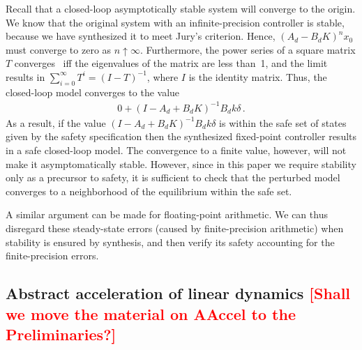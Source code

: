 \documentclass[twocolumn]{autart}    %
\renewcommand{\note}[1]{\textcolor{red}{[#1]}}
\begin{document}
\normalsize
Recall that a closed-loop asymptotically stable system will converge to the origin.  
We know that the original system with an infinite-precision controller is stable, 
because we have synthesized it to meet Jury's criterion.  
Hence, $(A_d - B_dK)^n x_0$  must converge to zero as $n \uparrow \infty$. 
Furthermore, the power series of a square matrix $T$ converges~\cite{horn1990matrix} iff the eigenvalues of the matrix are less
than~1, and the limit results in 
%
$\sum_{i=0}^{\infty}T^i  = (I - T)^{-1}$, 
%
where $I$ is the identity matrix. 
Thus, the closed-loop model converges to the value 
%
\begin{align*}
0 + (I - A_d + B_dK)^{-1}B_dk\delta \,. 
\end{align*}
%
As a result, if the value $(I - A_d + B_dK)^{-1}B_dk\delta$ is within the safe set of states given by the safety specification
then the synthesized fixed-point controller results in a safe
closed-loop model.  The convergence to a finite value, however, will not
make it asymptomatically stable.
However,
since in this paper we require stability only as a precursor to safety, it
is sufficient to check that the perturbed model converges to a
neighborhood of the equilibrium within the safe set. 

A similar argument can be made for floating-point arithmetic.
We can thus disregard these steady-state errors (caused by
finite-precision arithmetic) when stability is ensured by synthesis, and then verify its
safety accounting for the finite-precision errors.



\ifx\axelerator
\subsection{Abstract acceleration of linear dynamics \note{Shall we move the material on AAccel to the Preliminaries?}} 
\label{ssec:aa}
 
\end{document}
